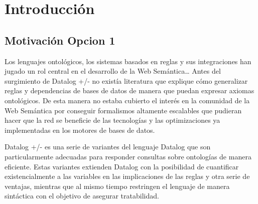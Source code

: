 \documentclass[11pt,a4paper,twoside]{tesis}
\begin{document}

\def\autor{Pablo Víctor Fromer}
\def\tituloTesis{Datalog +/-, \vspace{.2cm} \\ una interfaz tolerante a la inconsistencia }
\def\runtitulo{Datalog +/-, una interfaz tolerante a la inconsistencia}
\def\runtitle{Datalog +/-, una interfaz tolerante a la inconsistencia}
\def\director{María Vanina Martinez}
\def\codirector{Ricardo Oscar Rodriguez}
\def\lugar{Buenos Aires, 2019}


%




\cleardoublepage
\tableofcontents

\mainmatter
\pagestyle{headings}


\chapter{Introducción}
\section{Motivación Opcion 1}

Los lenguajes ontológicos, los sistemas basados en reglas y sus integraciones han jugado un rol central en el desarrollo de la Web Semántica…  Antes del surgimiento de Datalog +/- no existía literatura que explique cómo generalizar reglas y dependencias de bases de datos de manera que puedan expresar axiomas ontológicos. De esta manera no estaba cubierto el interés en la comunidad de la Web Semántica por conseguir formalismos altamente escalables que pudieran hacer que la red se beneficie de las tecnologías y las optimizaciones ya implementadas en los motores de bases de datos.

Datalog +/- es una serie de variantes del lenguaje Datalog que son particularmente adecuadas para responder consultas sobre ontologías de manera eficiente. Estas variantes extienden Datalog con la posibilidad de cuantificar existencialmente a las variables en las implicaciones de las reglas y otra serie de ventajas, mientras que al mismo tiempo restringen el lenguaje de manera sintáctica con el objetivo de asegurar tratabilidad.
\end{document}
